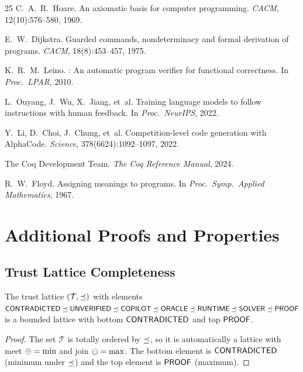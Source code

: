 \documentclass[11pt]{article}
\begin{document}
\begin{thebibliography}{25}
C.~A.~R.~Hoare.
\newblock An axiomatic basis for computer programming.
\newblock \emph{CACM}, 12(10):576--580, 1969.

E.~W.~Dijkstra.
\newblock Guarded commands, nondeterminacy and formal derivation
  of programs.
\newblock \emph{CACM}, 18(8):453--457, 1975.

K.~R.~M.~Leino.
: An automatic program verifier for functional
  correctness.
\newblock In \emph{Proc.\ LPAR}, 2010.

L.~Ouyang, J.~Wu, X.~Jiang, et~al.
\newblock Training language models to follow instructions with
  human feedback.
\newblock In \emph{Proc.\ NeurIPS}, 2022.

Y.~Li, D.~Choi, J.~Chung, et~al.
\newblock Competition-level code generation with {AlphaCode}.
\newblock \emph{Science}, 378(6624):1092--1097, 2022.

The Coq Development Team.
\newblock \emph{The Coq Reference Manual}, 2024.

R.~W.~Floyd.
\newblock Assigning meanings to programs.
\newblock In \emph{Proc.\ Symp.\ Applied Mathematics}, 1967.

\end{thebibliography}

\appendix
\section{Additional Proofs and Properties}
\label{app:proofs}

\subsection{Trust Lattice Completeness}
\label{app:lattice}

\begin{lemma}
\label{lem:bounded-lattice}
The trust lattice $(\mathcal{T}, \preceq)$ with elements
$\mathsf{CONTRADICTED} \preceq \mathsf{UNVERIFIED} \preceq \mathsf{COPILOT} \preceq \mathsf{ORACLE}
\preceq \mathsf{RUNTIME} \preceq \mathsf{SOLVER} \preceq \mathsf{PROOF}$
is a bounded lattice with bottom $\mathsf{CONTRADICTED}$ and top $\mathsf{PROOF}$.
\end{lemma}

\begin{proof}
The set $\mathcal{T}$ is totally ordered by $\preceq$, so it is
automatically a lattice with meet $\oplus = \min$ and join
$\ominus = \max$.  The bottom element is $\mathsf{CONTRADICTED}$ (minimum
under $\preceq$) and the top element is $\mathsf{PROOF}$ (maximum).
\end{proof}
\end{document}
